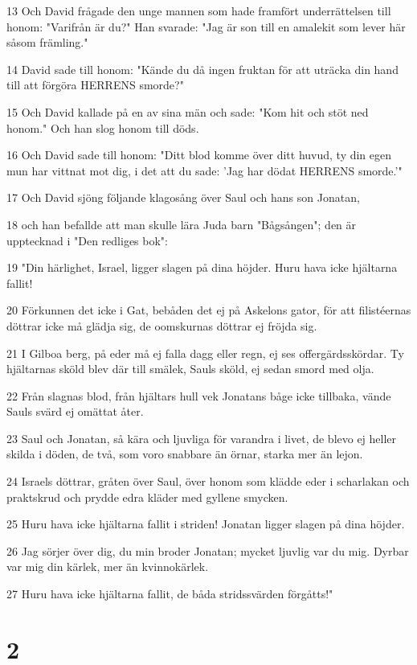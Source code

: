 \par 13 Och David frågade den unge mannen som hade framfört underrättelsen till honom: "Varifrån är du?" Han svarade: "Jag är son till en amalekit som lever här såsom främling."
\par 14 David sade till honom: "Kände du då ingen fruktan för att uträcka din hand till att förgöra HERRENS smorde?"
\par 15 Och David kallade på en av sina män och sade: "Kom hit och stöt ned honom." Och han slog honom till döds.
\par 16 Och David sade till honom: "Ditt blod komme över ditt huvud, ty din egen mun har vittnat mot dig, i det att du sade: 'Jag har dödat HERRENS smorde.'"
\par 17 Och David sjöng följande klagosång över Saul och hans son Jonatan,
\par 18 och han befallde att man skulle lära Juda barn "Bågsången"; den är upptecknad i "Den redliges bok":
\par 19 "Din härlighet, Israel, ligger slagen på dina höjder. Huru hava icke hjältarna fallit!
\par 20 Förkunnen det icke i Gat, bebåden det ej på Askelons gator, för att filistéernas döttrar icke må glädja sig, de oomskurnas döttrar ej fröjda sig.
\par 21 I Gilboa berg, på eder må ej falla dagg eller regn, ej ses offergärdsskördar. Ty hjältarnas sköld blev där till smälek, Sauls sköld, ej sedan smord med olja.
\par 22 Från slagnas blod, från hjältars hull vek Jonatans båge icke tillbaka, vände Sauls svärd ej omättat åter.
\par 23 Saul och Jonatan, så kära och ljuvliga för varandra i livet, de blevo ej heller skilda i döden, de två, som voro snabbare än örnar, starka mer än lejon.
\par 24 Israels döttrar, gråten över Saul, över honom som klädde eder i scharlakan och praktskrud och prydde edra kläder med gyllene smycken.
\par 25 Huru hava icke hjältarna fallit i striden! Jonatan ligger slagen på dina höjder.
\par 26 Jag sörjer över dig, du min broder Jonatan; mycket ljuvlig var du mig. Dyrbar var mig din kärlek, mer än kvinnokärlek.
\par 27 Huru hava icke hjältarna fallit, de båda stridssvärden förgåtts!"

\chapter{2}

